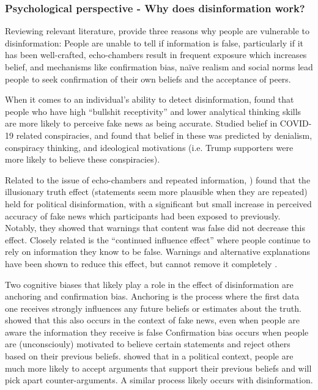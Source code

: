 \subsubsection{Psychological perspective - Why does disinformation work?}
Reviewing relevant literature, \cite{Kumar2018} provide three reasons why people are vulnerable to disinformation: People are unable to tell if information is false, particularly if it has been well-crafted, echo-chambers result in frequent exposure which increases belief, and mechanisms like confirmation bias, naïve realism and social norms lead people to seek confirmation of their own beliefs and the acceptance of peers. 

When it comes to an individual's ability to detect disinformation, \cite{Pennycook2018} found that people who have high ``bullshit receptivity'' and lower analytical thinking skills are more likely to perceive fake news as being accurate.\cite{uscinski2020people} Studied belief in COVID-19 related conspiracies, and found that belief in these was predicted by denialism, conspiracy thinking, and ideological motivations (i.e. Trump supporters were more likely to believe these conspiracies).

Related to the issue of echo-chambers and repeated information, \cite{Pennycook2018a}) found that the illusionary truth effect (statements seem more plausible when they are repeated) held for political disinformation, with a significant but small increase in perceived accuracy of fake news which participants had been exposed to previously. Notably, they showed that warnings that content was false did not decrease this effect. Closely related is the “continued influence effect” where people continue to rely on information they know to be false. Warnings and alternative explanations have been shown to reduce this effect, but cannot remove it completely \cite{Ecker2010}.


Two cognitive biases that likely play a role in the effect of disinformation are anchoring and confirmation bias. Anchoring is the process where the first data one receives strongly influences any future beliefs or estimates about the truth. \cite{jost2020fake} showed that this also occurs in the context of fake news, even when people are aware the information they receive is false Confirmation bias occurs when people are (unconsciouly) motivated to believe certain statements and reject others based on their previous beliefs. \cite{taber2006motivated} showed that in a political context, people are much more likely to accept arguments that support their previous beliefs and will pick apart counter-arguments. A similar process likely occurs with disinformation.

